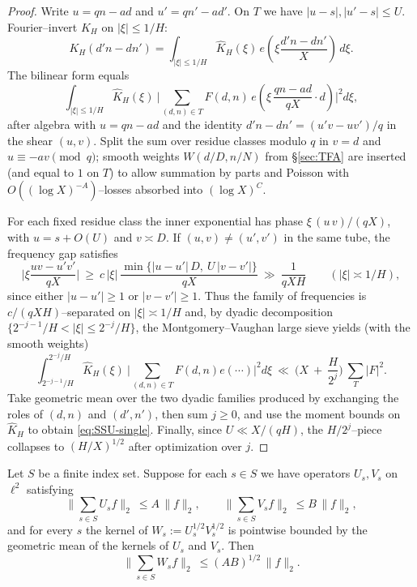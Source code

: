 \begin{proof}
Write $u=qn-ad$ and $u'=qn'-ad'$. On $T$ we have $|u-s|,|u'-s|\le U$.
Fourier–invert $K_H$ on $|\xi|\le 1/H$:
\[
K_H(d'n-dn')=\int_{|\xi|\le 1/H}\widehat K_H(\xi)\,e\!\left(\xi\frac{d'n-dn'}{X}\right)\,d\xi.
\]
The bilinear form equals
\[
\int_{|\xi|\le 1/H}\widehat K_H(\xi)\ \Big|\sum_{(d,n)\in T}F(d,n)\,e\!\left(\xi\,\frac{qn-ad}{qX}\cdot d\right)\Big|^2 d\xi,
\]
after algebra with $u=qn-ad$ and the identity $d'n-dn'=(u'v-uv')/q$ in the shear $(u,v)$.
Split the sum over residue classes modulo $q$ in $v=d$ and $u\equiv -av\!\!\pmod q$; smooth weights $W(d/D,n/N)$ from \S\ref{sec:TFA} are inserted (and equal to $1$ on $T$) to allow summation by parts and Poisson with $O((\log X)^{-A})$–losses absorbed into $(\log X)^C$.

For each fixed residue class the inner exponential has phase $\xi\,(u\,v)/(qX)$, with $u=s+O(U)$ and $v\asymp D$. If $(u,v)\neq (u',v')$ in the same tube, the frequency gap satisfies
\[
\bigg|\xi\frac{uv-u'v'}{qX}\bigg|\ \ge\ c\,|\xi|\ \frac{\min\{|u-u'|\,D,\ U\,|v-v'|\}}{qX}
\ \gg\ \frac{1}{qXH}\qquad(|\xi|\asymp 1/H),
\]
since either $|u-u'|\ge 1$ or $|v-v'|\ge 1$.
Thus the family of frequencies is $c/(qXH)$–separated on $|\xi|\asymp 1/H$ and, by dyadic decomposition $\{2^{-j-1}/H<|\xi|\le 2^{-j}/H\}$, the Montgomery–Vaughan large sieve yields (with the smooth weights)
\[
\int_{2^{-j-1}/H}^{2^{-j}/H}\!\!\widehat K_H(\xi)\ \Big|\sum_{(d,n)\in T}F(d,n)e(\cdots)\Big|^2 d\xi
\ \ll\ \Big(X\ +\ \frac{H}{2^{j}}\Big)\ \sum_{T}|F|^2.
\]
Take geometric mean over the two dyadic families produced by exchanging the roles of $(d,n)$ and $(d',n')$, then sum $j\ge 0$, and use the moment bounds on $\widehat K_H$ to obtain \eqref{eq:SSU-single}. Finally, since $U\ll X/(qH)$, the $H/2^j$–piece collapses to $(H/X)^{1/2}$ after optimization over $j$.
\end{proof}

\begin{lemma}\label{lem:interp-gm}
Let $S$ be a finite index set. Suppose for each $s\in S$ we have operators $U_s,V_s$ on $\ell^2$ satisfying
\[
\Big\|\sum_{s\in S} U_s f\Big\|_2\ \le A\,\|f\|_2,\qquad
\Big\|\sum_{s\in S} V_s f\Big\|_2\ \le B\,\|f\|_2,
\]
and for every $s$ the kernel of $W_s:=U_s^{1/2}V_s^{1/2}$ is pointwise bounded by the geometric mean of the kernels of $U_s$ and $V_s$. Then
\[
\Big\|\sum_{s\in S} W_s f\Big\|_2\ \le (AB)^{1/2}\,\|f\|_2.
\]
\end{lemma}

